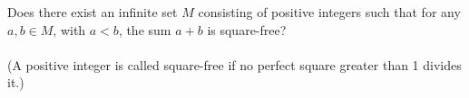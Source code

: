 \documentclass{article}
\begin{document}
\setlength{\parindent}{0pt}
Does there exist an infinite set \( M \) consisting of positive integers such that for any \( a, b \in M \), with \( a < b \), the sum \( a + b \) is square-free?\\
\;\\
(A positive integer is called square-free if no perfect square greater than 1 divides it.)

\end{document}
